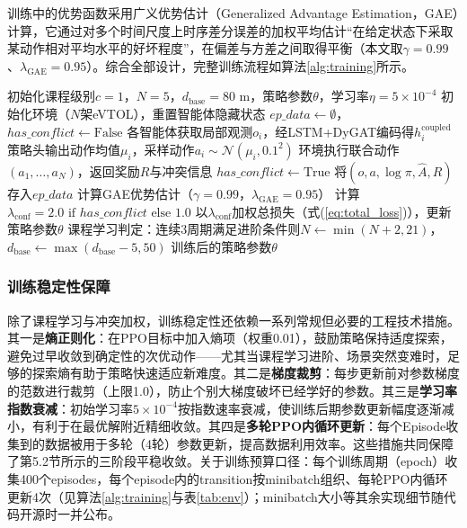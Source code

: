 \documentclass[12pt,a4paper,UTF8]{ctexart}
\begin{document}
训练中的优势函数采用广义优势估计（Generalized Advantage Estimation，GAE）\cite{ref38}计算，它通过对多个时间尺度上时序差分误差的加权平均估计“在给定状态下采取某动作相对平均水平的好坏程度”，在偏差与方差之间取得平衡（本文取$\gamma=0.99$、$\lambda_{\text{GAE}}=0.95$）。综合全部设计，完整训练流程如算法\ref{alg:training}所示。

\begin{algorithm}[H]
\caption{基于DyGAT-MARL的协同管控模型训练流程}
\label{alg:training}
\begin{algorithmic}[1]
\STATE 初始化课程级别$c=1$，$N=5$，$d_{\text{base}}=80$ m，策略参数$\theta$，学习率$\eta=5\times10^{-4}$
    \STATE 初始化环境（$N$架eVTOL），重置智能体隐藏状态
    \STATE $ep\_data \leftarrow \emptyset$，$has\_conflict \leftarrow \text{False}$
    \REPEAT
        \STATE 各智能体获取局部观测$o_i$，经LSTM+DyGAT编码得$h_i^{\text{coupled}}$
        \STATE 策略头输出动作均值$\mu_i$，采样动作$a_i\sim\mathcal{N}(\mu_i,0.1^{2})$
        \STATE 环境执行联合动作$(a_1,\ldots,a_N)$，返回奖励$R$与冲突信息
         \STATE $has\_conflict \leftarrow \text{True}$ \ENDIF
        \STATE 将$(o,a,\log\pi,\hat{A},R)$存入$ep\_data$
    \STATE 计算GAE\cite{ref38}优势估计（$\gamma=0.99$，$\lambda_{\text{GAE}}=0.95$）
    \STATE 计算$\lambda_{\text{conf}} = 2.0 \text{ if } has\_conflict \text{ else } 1.0$
    \STATE 以$\lambda_{\text{conf}}$加权总损失（式(\ref{eq:total_loss})），更新策略参数$\theta$
    \STATE 课程学习判定：连续3周期满足进阶条件则$N\leftarrow\min(N+2,21)$，$d_{\text{base}}\leftarrow\max(d_{\text{base}}-5,50)$
\ENDFOR
\STATE \RETURN 训练后的策略参数$\theta$
\end{algorithmic}
\end{algorithm}

\subsubsection{训练稳定性保障}

除了课程学习与冲突加权，训练稳定性还依赖一系列常规但必要的工程技术措施。其一是\textbf{熵正则化}：在PPO目标中加入熵项（权重0.01），鼓励策略保持适度探索，避免过早收敛到确定性的次优动作——尤其当课程学习进阶、场景突然变难时，足够的探索熵有助于策略快速适应新难度。其二是\textbf{梯度裁剪}：每步更新前对参数梯度的范数进行裁剪（上限1.0），防止个别大梯度破坏已经学好的参数。其三是\textbf{学习率指数衰减}：初始学习率$5\times10^{-4}$按指数速率衰减，使训练后期参数更新幅度逐渐减小，有利于在最优解附近精细收敛。其四是\textbf{多轮PPO内循环更新}：每个Episode收集到的数据被用于多轮（4轮）参数更新，提高数据利用效率。这些措施共同保障了第5.2节所示的三阶段平稳收敛。关于训练预算口径：每个训练周期（epoch）收集400个episodes，每个episode内的transition按minibatch组织、每轮PPO内循环更新4次（见算法\ref{alg:training}与表\ref{tab:env}）；minibatch大小等其余实现细节随代码开源时一并公布。
\end{document}
